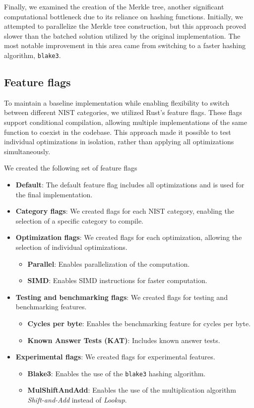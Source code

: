 \documentclass[11pt]{report}
\theoremstyle{definition}
\theoremstyle{plain}
\begin{document}
Finally, we examined the creation of the Merkle tree, another significant computational bottleneck due to its reliance on hashing functions. Initially, we attempted to parallelize the Merkle tree construction, but this approach proved slower than the batched solution utilized by the original implementation. The most notable improvement in this area came from switching to a faster hashing algorithm, \texttt{blake3}.

\subsection{Feature flags}\label{sub:feature_flags}
To maintain a baseline implementation while enabling flexibility to switch between different NIST categories, we utilized Rust's feature flags. These flags support conditional compilation, allowing multiple implementations of the same function to coexist in the codebase. This approach made it possible to test individual optimizations in isolation, rather than applying all optimizations simultaneously.

We created the following set of feature flags

\begin{itemize}[parsep=0pt, itemsep=3pt]
  \item \textbf{Default}: The default feature flag includes all optimizations and is used for the final implementation.
  \item \textbf{Category flags}: We created flags for each NIST category, enabling the selection of a specific category to compile.
  \item \textbf{Optimization flags}: We created flags for each optimization, allowing the selection of individual optimizations.
        \begin{itemize}
          \item \textbf{Parallel}: Enables parallelization of the computation.
          \item \textbf{SIMD}: Enables SIMD instructions for faster computation.
        \end{itemize}
  \item \textbf{Testing and benchmarking flags}: We created flags for testing and benchmarking features.
        \begin{itemize}
          \item \textbf{Cycles per byte}: Enables the benchmarking feature for cycles per byte.
          \item \textbf{Known Answer Tests (KAT)}: Includes known answer tests.
        \end{itemize}
  \item \textbf{Experimental flags}: We created flags for experimental features.
        \begin{itemize}
          \item \textbf{Blake3}: Enables the use of the \texttt{blake3} hashing algorithm.
          \item \textbf{MulShiftAndAdd}: Enables the use of the multiplication algorithm \textit{Shift-and-Add} instead of \textit{Lookup}.
        \end{itemize}
\end{itemize}
\end{document}
